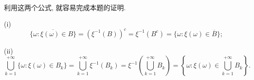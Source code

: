 利用这两个公式, 就容易完成本题的证明.
\begin{yyProof}
	\begin{blist}
		\item[(i)] \begin{equation}
		\overline{\{\omega:\xi(\omega)\in B  \}} = \left(\xi^{-1}(B)\right)^c = \xi^{-1}(B^c) = \{ \omega:\xi(\omega)\in\overline{B} \};
		\end{equation}
		\item[(ii)] \begin{equation}
		\bigcup_{k=1}^{+\infty}\{\omega:\xi(\omega)\in  B_k\} 
		=\bigcup_{k=1}^{+\infty}\xi^{-1}(B_k) = \xi^{-1}\left(\bigcup_{k=1}^{+\infty}B_k\right)
		= \left\{ \omega:\xi(\omega)\in\bigcup_{k=1}^{+\infty}B_k \right\}.
		\end{equation}
	\end{blist}
\end{yyProof}
